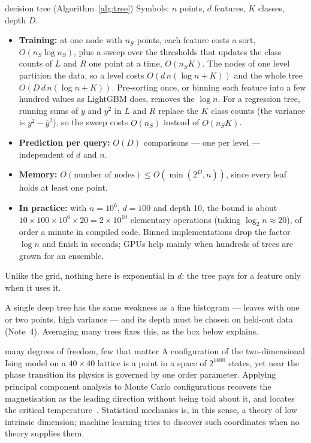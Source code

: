 \documentclass[11pt]{article}
\begin{document}
\begin{runtime}{decision tree (Algorithm~\ref{alg:tree})}
Symbols: $n$ points, $d$ features, $K$ classes, depth $D$.
\begin{itemize}[leftmargin=1.2em]
\item \textbf{Training:} at one node with $n_S$ points, each feature costs a sort, $O(n_S \log n_S)$, plus a sweep over
the thresholds that updates the class counts of $L$ and $R$ one point at a time, $O(n_S K)$. The nodes of one level
partition the data, so a level costs $O(d\, n (\log n + K))$ and the whole tree $O(D\, d\, n(\log n + K))$.
Pre-sorting once, or binning each feature into a few hundred values as LightGBM does, removes the $\log n$.
For a regression tree, running sums of $y$ and $y^2$ in $L$ and $R$ replace the $K$ class counts (the variance is
$\overline{y^2} - \bar y^2$), so the sweep costs $O(n_S)$ instead of $O(n_S K)$.
\item \textbf{Prediction per query:} $O(D)$ comparisons --- one per level --- independent of $d$ and $n$.
\item \textbf{Memory:} $O(\text{number of nodes}) \le O(\min(2^{D}, n))$, since every leaf holds at least one point.
\item \textbf{In practice:} with $n = 10^6$, $d = 100$ and depth 10, the bound is about
$10 \times 100 \times 10^6 \times 20 = 2 \times 10^{10}$ elementary operations (taking $\log_2 n \approx 20$), of order
a minute in compiled code. Binned implementations drop the factor $\log n$ and finish in seconds; GPUs help mainly when
hundreds of trees are grown for an ensemble.
\end{itemize}
Unlike the grid, nothing here is exponential in $d$: the tree pays for a feature only when it uses it.
\end{runtime}

A single deep tree has the same weakness as a fine histogram --- leaves with one or two points, high variance --- and
its depth must be chosen on held-out data (Note~4). Averaging many trees fixes this, as the box below explains.

\begin{physics}{many degrees of freedom, few that matter}
A configuration of the two-dimensional Ising model on a $40 \times 40$ lattice is a point in a space of $2^{1600}$
states, yet near the phase transition its physics is governed by one order parameter. Applying principal component
analysis to Monte Carlo configurations recovers the magnetisation as the leading direction without being told about
it, and locates the critical temperature~\cite{wang2016}. Statistical mechanics is, in this sense, a theory of low
intrinsic dimension; machine learning tries to discover such coordinates when no theory supplies them.
\end{physics}
\end{document}
